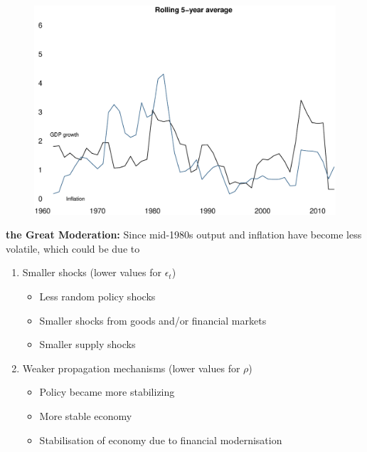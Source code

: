 \documentclass{beamer}
\begin{document}
\begin{frame}
  \begin{figure}
    \includegraphics[scale=.3]{great_moderation.eps}
  \end{figure}
\end{frame}

\begin{frame}
  \textbf{the Great Moderation:} Since mid-1980s output and inflation have become less volatile, which could be due to
  \begin{enumerate}
  \item Smaller shocks (lower values for $\epsilon_t$)
  \begin{itemize}
    \item Less random policy shocks
    \item Smaller shocks from goods and/or financial markets
    \item Smaller supply shocks
  \end{itemize}
  \medskip
  \item Weaker propagation mechanisms (lower values for $\rho$)
  \begin{itemize}
    \item Policy became more stabilizing
    \item More stable economy
    \item Stabilisation of economy due to financial modernisation
  \end{itemize}
\end{enumerate}
\end{frame}
\end{document}
